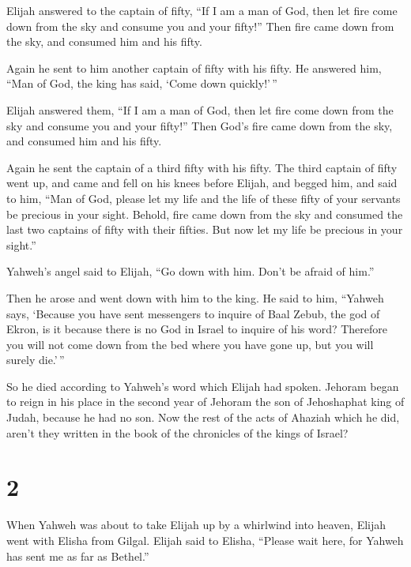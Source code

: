  Elijah answered to the captain of fifty, ``If I am a man
of God, then let fire come down from the sky and consume you and your
fifty!'' Then fire came down from the sky, and consumed him and his
fifty.

 Again he sent to him another captain of fifty with his
fifty. He answered him, ``Man of God, the king has said, `Come down
quickly!'\,''

 Elijah answered them, ``If I am a man of God, then let
fire come down from the sky and consume you and your fifty!'' Then God's
fire came down from the sky, and consumed him and his fifty.

 Again he sent the captain of a third fifty with his
fifty. The third captain of fifty went up, and came and fell on his
knees before Elijah, and begged him, and said to him, ``Man of God,
please let my life and the life of these fifty of your servants be
precious in your sight.  Behold, fire came down from the
sky and consumed the last two captains of fifty with their fifties. But
now let my life be precious in your sight.''

 Yahweh's angel said to Elijah, ``Go down with him. Don't
be afraid of him.''

Then he arose and went down with him to the king.  He
said to him, ``Yahweh says, `Because you have sent messengers to inquire
of Baal Zebub, the god of Ekron, is it because there is no God in Israel
to inquire of his word? Therefore you will not come down from the bed
where you have gone up, but you will surely die.'\,''

 So he died according to Yahweh's word which Elijah had
spoken. Jehoram began to reign in his place in the second year of
Jehoram the son of Jehoshaphat king of Judah, because he had no son.
 Now the rest of the acts of Ahaziah which he did, aren't
they written in the book of the chronicles of the kings of Israel?

\hypertarget{section-1}{%
\section{2}\label{section-1}}

 When Yahweh was about to take Elijah up by a whirlwind
into heaven, Elijah went with Elisha from Gilgal.  Elijah
said to Elisha, ``Please wait here, for Yahweh has sent me as far as
Bethel.''

